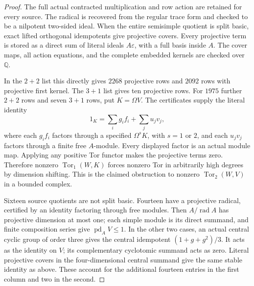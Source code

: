 \begin{proof}
The full actual contracted multiplication and row action are retained
for every source.  The radical is recovered from the regular trace
form and checked to be a nilpotent two-sided ideal.  When the entire
semisimple quotient is split basic, exact lifted orthogonal
idempotents give projective covers.  Every projective term is stored
as a direct sum of literal ideals $A\varepsilon$, with a full basis
inside $A$.  The cover maps, all action equations, and the complete
embedded kernels are checked over $\mathbb Q$.

In the $2+2$ list this directly gives $2268$ projective rows and
$2092$ rows with projective first kernel.  The $3+1$ list gives ten
projective rows.  For $1975$ further $2+2$ rows and seven $3+1$ rows,
put $K=\Omega V$.  The certificates supply the literal identity
\[
 1_K=\sum_i g_i f_i+\sum_j u_jv_j,
\]
where each $g_if_i$ factors through a specified
$\Omega^sK$, with $s=1$ or $2$, and each $u_jv_j$ factors through a
finite free $A$-module.  Every displayed factor is an actual module
map.  Applying any positive Tor functor makes the projective terms
zero.  Therefore nonzero $\operatorname{Tor}_1(W,K)$ forces nonzero
Tor in arbitrarily high degrees by dimension shifting.  This is the
claimed obstruction to nonzero $\operatorname{Tor}_2(W,V)$ in a
bounded complex.

Sixteen source quotients are not split basic.  Fourteen have a
projective radical, certified by an identity factoring through free
modules.  Then $A/\operatorname{rad}A$ has projective dimension at
most one; each simple module is its direct summand, and finite
composition series give $\operatorname{pd}_A V\leq1$.
In the other two cases, an actual central cyclic group of order three
gives the central idempotent
$(1+g+g^2)/3$.  It acts as the identity on $V$; its complementary
cyclotomic summand acts as zero.  Literal projective covers in the
four-dimensional central summand give the same stable identity as
above.  These account for the additional fourteen entries in the
first column and two in the second.


\end{proof}

